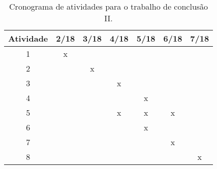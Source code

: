 \documentclass[11pt,a4paper]{article}
\begin{document}
\begin{table}[h]
\begin{center}
	\caption{Cronograma de atividades para o trabalho de conclusão II. \label{tab:cronograma2}}
		\begin{tabular}{|c|c|c|c|c|c|c|}
			\hline			
			 \bf Atividade & \bf 2/18 & \bf 3/18 & \bf 4/18 & \bf 5/18 & \bf 6/18 & \bf 7/18  \\	\hline \hline
					 1 & x &   &   &   &   &   \\ \hline
					 2 &   & x &   &   &   &   \\ \hline
					 3 &   &   & x &   &   &   \\ \hline
					 4 &   &   &   & x &   &   \\ \hline
					 5 &   &   & x & x & x &   \\ \hline
					 6 &   &   &   & x  &   &   \\ \hline
					 7 &   &   &   &   & x &   \\ \hline
					 8 &   &   &   &   &   & x \\ \hline
		\end{tabular}
\end{center}		

\renewcommand\ref{Referências}
{\small


}
\end{table}
\end{document}
